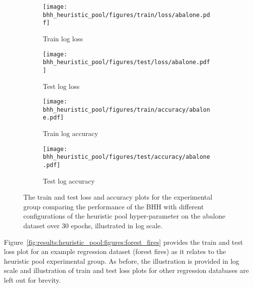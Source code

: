 \begin{figure}[H]
	\begin{subfigure}{0.5\textwidth}
		\centering
		\texttt{[image: bhh\_heuristic\_pool/figures/train/loss/abalone.pdf]}
		\caption{Train log loss}
		\label{fig:results:heuristic_pool:figures:loss:train:abalone}
	\end{subfigure}
	\begin{subfigure}{0.5\textwidth}
		\centering
		\texttt{[image: bhh\_heuristic\_pool/figures/test/loss/abalone.pdf]}
		\caption{Test log loss}
		\label{fig:results:heuristic_pool:figures:loss:test:abalone}
	\end{subfigure}
	\par\bigskip
	\begin{subfigure}{0.5\textwidth}
		\centering
		\texttt{[image: bhh\_heuristic\_pool/figures/train/accuracy/abalone.pdf]}
		\caption{Train log accuracy}
		\label{fig:results:heuristic_pool:figures:accuracy:train:abalone}
	\end{subfigure}
	\begin{subfigure}{0.5\textwidth}
		\centering
		\texttt{[image: bhh\_heuristic\_pool/figures/test/accuracy/abalone.pdf]}
		\caption{Test log accuracy}
		\label{fig:results:heuristic_pool:figures:accuracy:test:abalone}
	\end{subfigure}
	\par\bigskip
	\caption{The train and test loss and accuracy plots for the experimental group comparing the performance of the \acs{BHH} with different configurations of the heuristic pool hyper-parameter on the abalone dataset over 30 epochs, illustrated in log scale.}
	\label{fig:results:heuristic_pool:figures:abalone}
\end{figure}

Figure~\ref{fig:results:heuristic_pool:figures:forest_fires} provides the train and test loss plot for an example regression dataset (forest fires) as it relates to the heuristic pool experimental group. As before, the illustration is provided in log scale and illustration of train and test loss plots for other regression databases are left out for brevity.


